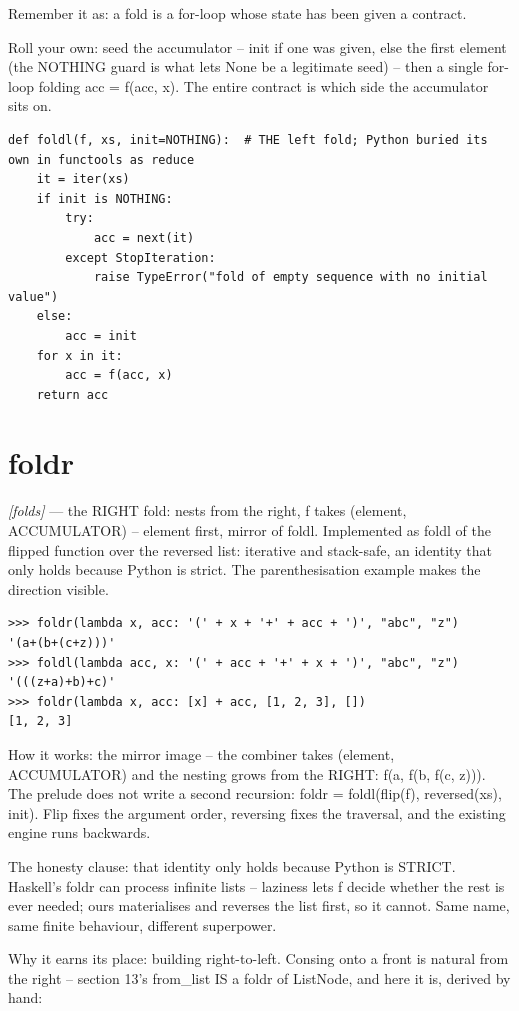 \documentclass[11pt,letterpaper]{book}
\begin{document}
Remember it as: a fold is a for-loop whose state has been given a contract.


Roll your own: seed the accumulator -- init if one was given, else the first element (the NOTHING guard is what lets None be a legitimate seed) -- then a single for-loop folding acc = f(acc, x). The entire contract is which side the accumulator sits on.

\begin{lstlisting}[style=code]
def foldl(f, xs, init=NOTHING):  # THE left fold; Python buried its own in functools as reduce
    it = iter(xs)
    if init is NOTHING:
        try:
            acc = next(it)
        except StopIteration:
            raise TypeError("fold of empty sequence with no initial value")
    else:
        acc = init
    for x in it:
        acc = f(acc, x)
    return acc
\end{lstlisting}

\section{foldr}
\noindent\textit{[folds]} --- the RIGHT fold: nests from the right, f takes (element, ACCUMULATOR) -- element first, mirror of foldl. Implemented as foldl of the flipped function over the reversed list: iterative and stack-safe, an identity that only holds because Python is strict. The parenthesisation example makes the direction visible.
\begin{lstlisting}[style=spec]
>>> foldr(lambda x, acc: '(' + x + '+' + acc + ')', "abc", "z")
'(a+(b+(c+z)))'
>>> foldl(lambda acc, x: '(' + acc + '+' + x + ')', "abc", "z")
'(((z+a)+b)+c)'
>>> foldr(lambda x, acc: [x] + acc, [1, 2, 3], [])
[1, 2, 3]
\end{lstlisting}

How it works: the mirror image -- the combiner takes (element, ACCUMULATOR) and the nesting grows from the RIGHT: f(a, f(b, f(c, z))). The prelude does not write a second recursion: foldr = foldl(flip(f), reversed(xs), init). Flip fixes the argument order, reversing fixes the traversal, and the existing engine runs backwards.


The honesty clause: that identity only holds because Python is STRICT. Haskell's foldr can process infinite lists -- laziness lets f decide whether the rest is ever needed; ours materialises and reverses the list first, so it cannot. Same name, same finite behaviour, different superpower.


Why it earns its place: building right-to-left. Consing onto a front is natural from the right -- section 13's from\_list IS a foldr of ListNode, and here it is, derived by hand:
\end{document}
